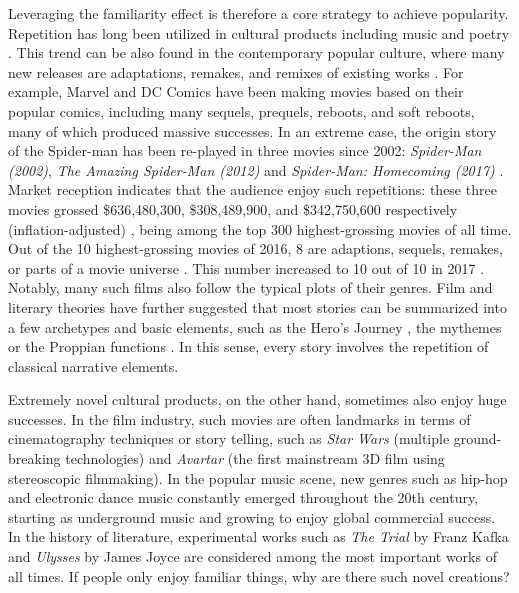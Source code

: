 \documentclass[letterpaper]{article} %
\begin{document}
Leveraging the familiarity effect is therefore a core strategy to achieve popularity. Repetition has long been utilized in cultural products including music and poetry \cite{huron2013psychological}. This trend can be also found in the contemporary popular culture, where many new releases are adaptations, remakes, and remixes of existing works \cite{manovich2007comes}. For example, Marvel and DC Comics have been making movies based on their popular comics, including many sequels, prequels, reboots, and soft reboots, many of which produced massive successes. In an extreme case, the origin story of the Spider-man has been re-played in three movies since 2002: \emph{Spider-Man (2002)}, \emph{The Amazing Spider-Man (2012)} and \emph{Spider-Man: Homecoming (2017)} \cite{spiderman}. Market reception indicates that the audience enjoy such repetitions: these three movies grossed \$636,480,300, \$308,489,900, and \$342,750,600 respectively (inflation-adjusted) \cite{spider-gross}, being among the top 300 highest-grossing movies of all time. Out of the 10 highest-grossing movies of 2016, 8 are adaptions, sequels, remakes, or parts of a movie universe \cite{2016film}. This number increased to 10 out of 10 in 2017 \cite{2017film}. Notably, many such films also follow the typical plots of their genres. Film and literary theories have further suggested that most stories can be summarized into a few archetypes and basic elements, such as the Hero's Journey \cite{campbell2008hero}, the mythemes \cite{levi1955structural} or the Proppian functions \cite{propp2010morphology}. In this sense, every story involves the repetition of classical narrative elements.

Extremely novel cultural products, on the other hand, sometimes also enjoy huge successes. In the film industry, such movies are often landmarks in terms of cinematography techniques or story telling, such as \emph{Star Wars} (multiple ground-breaking technologies) and \emph{Avartar} (the first mainstream 3D film using stereoscopic filmmaking). In the popular music scene, new genres such as hip-hop and electronic dance music constantly emerged throughout the 20th century, starting as underground music and growing to enjoy global commercial success. In the history of literature, experimental works such as \emph{The Trial} by Franz Kafka and \emph{Ulysses} by James Joyce are considered among the most important works of all times. If people only enjoy familiar things, why are there such novel creations?
\end{document}

